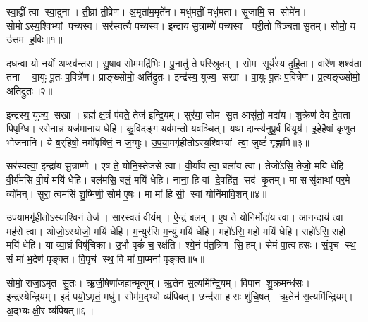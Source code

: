 \clearpage
{}
\setcounter{anuvakam}{0}

स्वा॒द्वीं त्वा स्वा॒दुना।
ती॒व्रां ती॒व्रेण॑।
अ॒मृता॑म॒मृते॑न।
मधु॑मतीं॒ मधु॑मता।
सृ॒जामि॒ स सोमे॑न।
सोमोऽस्य॒श्विभ्यां पच्यस्व।
सर॑स्वत्यै पच्यस्व।
इन्द्रा॑य सु॒त्राम्णे॑ पच्यस्व।
परी॒तो षि॑ञ्चता सु॒तम्।
सोमो॒ य उ॑त्त॒म ह॒विः॥१॥

द॒ध॒न्वा यो नर्यो॑ अ॒प्स्व॑न्तरा।
सु॒षाव॒ सोम॒मद्रि॑भिः।
पु॒नातु॑ ते परि॒स्रुतम्।
सोम॒ सूर्य॑स्य दुहि॒ता।
वारे॑ण॒ शश्व॑ता॒ तना।
वा॒युः पू॒तः प॒वित्रे॑ण।
प्राङ्ख्सोमो॒ अति॑द्रुतः।
इन्द्र॑स्य॒ युज्य॒ सखा।
वा॒युः पू॒तः प॒वित्रे॑ण।
प्र॒त्यङ्ख्सोमो॒ अति॑द्रुतः॥२॥

इन्द्र॑स्य॒ युज्य॒ सखा।
ब्रह्म॑ क्ष॒त्रं प॑वते॒ तेज॑ इन्द्रि॒यम्।
सुर॑या॒ सोम॑ सु॒त आसु॑तो॒ मदा॑य।
शु॒क्रेण॑ देव दे॒वता पिपृग्धि।
रसे॒नान्नं॒ यज॑मानाय धेहि।
कु॒विद॒ङ्ग यव॑मन्तो॒ यव॑ञ्चित्।
यथा॒ दान्त्य॑नुपू॒र्वं वि॒यूय॑।
इ॒हेहै॑षां कृणुत॒ भोज॑नानि।
ये ब॒र्‌हिषो॒ नमो॑वृक्तिं॒ न ज॒ग्मुः।
उ॒प॒या॒मगृ॑हीतोऽस्य॒श्विभ्यां त्वा॒ जुष्टं॑ गृह्णामि॥३॥

सर॑स्वत्या॒ इन्द्रा॑य सु॒त्राम्णे।
ए॒ष ते॒ योनि॒स्तेज॑से त्वा।
वी॒र्या॑य त्वा॒ बला॑य त्वा।
तेजो॑ऽसि॒ तेजो॒ मयि॑ धेहि।
वी॒र्य॑मसि वी॒र्यं॑ मयि॑ धेहि।
बल॑मसि॒ बलं॒ मयि॑ धेहि।
नाना॒ हि वां दे॒वहि॑त॒ सद॑ कृ॒तम्।
मा ससृ॑क्षाथां पर॒मे व्यो॑मन्।
सुरा॒ त्वमसि॑ शु॒ष्मिणी॒ सोम॑ ए॒षः।
मा मा॑ हिसी॒ स्वां योनि॑मावि॒शन्॥४॥

उ॒प॒या॒मगृ॑हीतोऽस्याश्वि॒नं तेज॑।
सा॒र॒स्व॒तं वी॒र्यम्।
ऐ॒न्द्रं बलम्।
ए॒ष ते॒ योनि॒र्मोदा॑य त्वा।
आ॒न॒न्दाय॑ त्वा॒ मह॑से त्वा।
ओजो॒ऽस्योजो॒ मयि॑ धेहि।
म॒न्युर॑सि म॒न्युं मयि॑ धेहि।
महो॑ऽसि॒ महो॒ मयि॑ धेहि।
सहो॑ऽसि॒ सहो॒ मयि॑ धेहि।
या व्या॒घ्रं विषू॑चिका।
उ॒भौ वृकं॑ च॒ रक्ष॑ति।
श्ये॒नं प॑त॒त्रिण सि॒हम्।
सेमं पा॒त्वह॑सः।
सं॒पृच॑ स्थ॒ सं मा॑ भ॒द्रेण॑ पृङ्क्त।
वि॒पृच॑ स्थ॒ वि मा॑ पा॒प्मना॑ पृङ्क्त॥५॥\anuvakamend[ह॒विः प्र॒त्यङ्ख्सोमो॒ अति॑द्रुतो गृह्णाम्यावि॒शन्विषू॑चिका॒ पञ्च॑ च]

सोमो॒ राजा॒ऽमृत सु॒तः।
ऋ॒जी॒षेणा॑जहान्मृ॒त्युम्।
ऋ॒तेन॑ स॒त्यमि॑न्द्रि॒यम्।
विपान शु॒क्रमन्ध॑सः।
इन्द्र॑स्येन्द्रि॒यम्।
इ॒दं पयो॒ऽमृतं॒ मधु॑।
सोम॑म॒द्भ्यो व्य॑पिबत्।
छन्द॑सा ह॒सः शु॑चि॒षत्।
ऋ॒तेन॑ स॒त्यमि॑न्द्रि॒यम्।
अ॒द्भ्यः क्षी॒रं व्य॑पिबत्॥६॥

